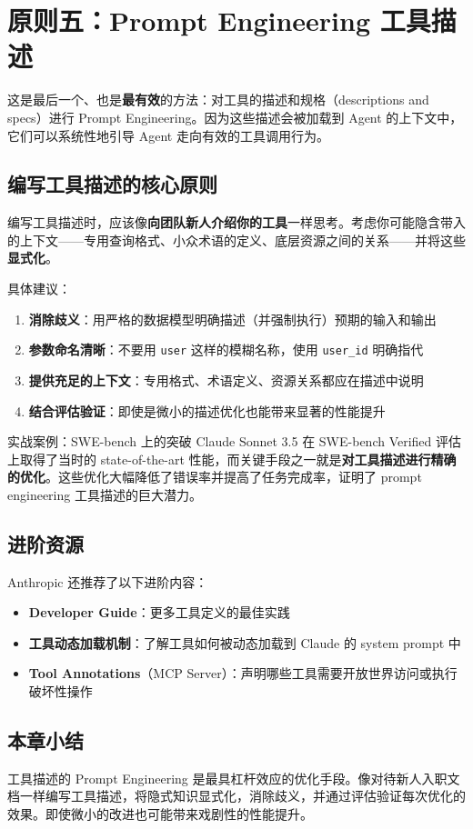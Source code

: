 \section{原则五：Prompt Engineering 工具描述}

这是最后一个、也是\textbf{最有效}的方法：对工具的描述和规格（descriptions and specs）进行 Prompt Engineering。因为这些描述会被加载到 Agent 的上下文中，它们可以系统性地引导 Agent 走向有效的工具调用行为。

\subsection{编写工具描述的核心原则}

编写工具描述时，应该像\textbf{向团队新人介绍你的工具}一样思考。考虑你可能隐含带入的上下文——专用查询格式、小众术语的定义、底层资源之间的关系——并将这些\textbf{显式化}。

具体建议：

\begin{enumerate}[leftmargin=1.5em]
    \item \textbf{消除歧义}：用严格的数据模型明确描述（并强制执行）预期的输入和输出
    \item \textbf{参数命名清晰}：不要用 \texttt{user} 这样的模糊名称，使用 \texttt{user\_id} 明确指代
    \item \textbf{提供充足的上下文}：专用格式、术语定义、资源关系都应在描述中说明
    \item \textbf{结合评估验证}：即使是微小的描述优化也能带来显著的性能提升
\end{enumerate}

\begin{importantbox}{实战案例：SWE-bench 上的突破}
Claude Sonnet 3.5 在 SWE-bench Verified 评估上取得了当时的 state-of-the-art 性能，而关键手段之一就是\textbf{对工具描述进行精确的优化}。这些优化大幅降低了错误率并提高了任务完成率，证明了 prompt engineering 工具描述的巨大潜力。
\end{importantbox}

\subsection{进阶资源}

Anthropic 还推荐了以下进阶内容：

\begin{itemize}[leftmargin=1.5em]
    \item \textbf{Developer Guide}：更多工具定义的最佳实践
    \item \textbf{工具动态加载机制}：了解工具如何被动态加载到 Claude 的 system prompt 中
    \item \textbf{Tool Annotations}（MCP Server）：声明哪些工具需要开放世界访问或执行破坏性操作
\end{itemize}

\subsection{本章小结}

工具描述的 Prompt Engineering 是最具杠杆效应的优化手段。像对待新人入职文档一样编写工具描述，将隐式知识显式化，消除歧义，并通过评估验证每次优化的效果。即使微小的改进也可能带来戏剧性的性能提升。


